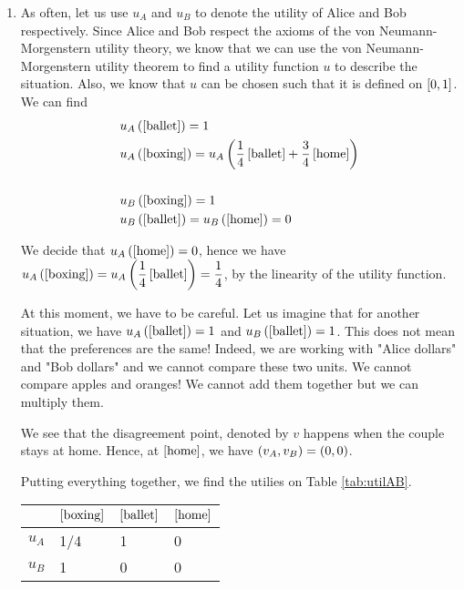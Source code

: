 \begin{enumerate} [label=\alph*.]
	\item As often, let us use $u_{A}$ and $u_{B}$ to denote the utility of Alice and Bob respectively. Since Alice and Bob respect the axioms of the von Neumann- Morgenstern utility theory, we know that we can use the von Neumann- Morgenstern utility theorem to find a utility function $u$ to describe the situation. Also, we know that $u$ can be chosen such that it is defined on $\squared{0, 1}$. We can find
	\begin{align*}
	    & u_{A} \parent{\squared{\text{ballet}}} = 1 \\
	    & u_{A} \parent{\squared{\text{boxing}}} = u_{A} \parent{ \dfrac{1}{4} \squared{\text{ballet}} + \dfrac{3}{4} \squared{\text{home}}} \\ \\
	    & u_{B} \parent{\squared{\text{boxing}}} = 1 \\
	    & u_{B} \parent{\squared{\text{ballet}}} = u_{B} \parent{\squared{\text{home}}} = 0
	\end{align*}
	
	We decide that $u_{A} \parent{\squared{\text{home}}} = 0$, hence we have $u_{A} \parent{\squared{\text{boxing}}} = u_{A} \parent{ \dfrac{1}{4} \squared{\text{ballet}}} = \dfrac{1}{4}$, by the linearity of the utility function.
	
	
	At this moment, we have to be careful. Let us imagine that for another situation, we have $u_{A} \parent{\squared{\text{ballet}}} = 1$ and $u_{B} \parent{\squared{\text{ballet}}} = 1$. This does not mean that the preferences are the same! Indeed, we are working with "Alice dollars" and "Bob dollars" and we cannot compare these two units. We cannot compare apples and oranges! We cannot add them together but we can multiply them. 
	
	We see that the disagreement point, denoted by $v$ happens when the couple stays at home. Hence, at $\squared{\text{home}}$, we have $\parent{v_{A}, v_{B}} = \parent{0, 0}$.
	
	Putting everything together, we find the utilies on Table \ref{tab:utilAB}. 
	

\begin{tabular}[h!]{r|lll}
            & $\squared{\text{boxing}}$ & $\squared{\text{ballet}}$ & $\squared{\text{home}}$ \\ \hline
$u_{A}$     & 1/4            & 1                         & 0 \\
$u_{B}$     & 1                         & 0                         & 0
\end{tabular}
\label{tab:utilAB}



\end{enumerate}
